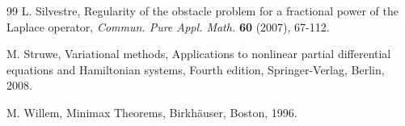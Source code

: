 \documentclass[10pt]{article}
\numberwithin{equation}{section}
\numberwithin{equation}{section}
\begin{document}
\begin{thebibliography}{99}
 L. Silvestre, Regularity of the obstacle problem for a fractional power of the Laplace operator, {\it Commun. Pure Appl. Math.} {\bf 60} (2007),
67-112.



 M. Struwe, Variational methods, Applications to nonlinear partial differential equations and Hamiltonian systems, Fourth edition, Springer-Verlag, Berlin, 2008.


 M. Willem, Minimax Theorems, Birkh\"{a}user, Boston, 1996.



\end{thebibliography}
\end{document}
